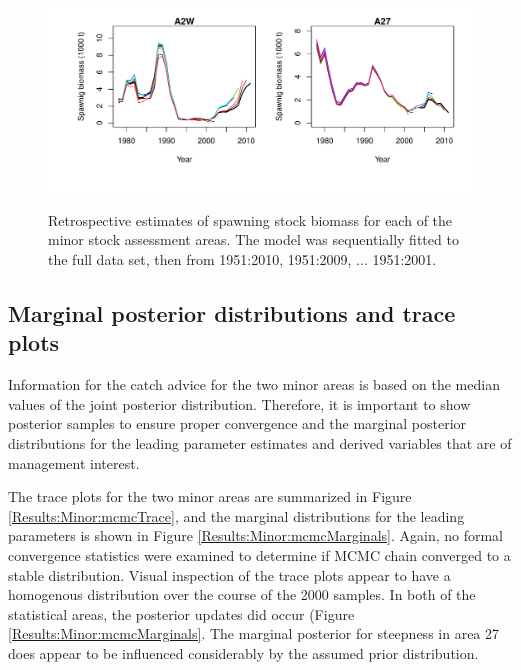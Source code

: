 \begin{figure}[!tbp]
	\includegraphics[width=\textwidth]{../FIGS/MinorAreas/iscam_fig_sbt_retrospective.pdf}\\
	\caption{Retrospective estimates of spawning stock biomass for each of the minor stock assessment areas.  The model was sequentially fitted to the full data set, then from 1951:2010, 1951:2009, ... 1951:2001.}\label{fig:Results:Minor:retrospective}
\end{figure}

\subsection{Marginal posterior distributions and trace plots}

Information for the catch advice for the two minor areas is based on the median values of the joint posterior distribution.  Therefore, it is important to show posterior samples to ensure proper convergence and the marginal posterior distributions for the leading parameter estimates and derived variables  that are of management interest.

 The trace plots for the two minor areas are summarized in Figure \ref{Results:Minor:mcmcTrace}, and the marginal distributions for the leading parameters is shown in Figure \ref{Results:Minor:mcmcMarginals}.  Again, no formal convergence statistics were examined to determine if MCMC chain converged to a stable distribution.  Visual inspection of the trace plots appear to have a homogenous distribution over the course of the 2000 samples.  In both of the statistical areas, the posterior updates did occur (Figure \ref{Results:Minor:mcmcMarginals}.  The marginal posterior for steepness in area 27 does appear to be influenced considerably by the assumed prior distribution.
 
